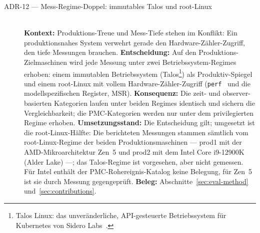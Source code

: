 \begin{description}
  \item[ADR-12 --- Mess-Regime-Doppel: immutables Talos und root-Linux]\hfill\\
  \textbf{Kontext:} Produktions-Treue und Mess-Tiefe stehen im Konflikt: Ein produktionsnahes
  System verwehrt gerade den Hardware-Zähler-Zugriff, den tiefe Messungen brauchen.
  \textbf{Entscheidung:} Auf den Produktions-Zielmaschinen wird jede Messung unter zwei
  Betriebssystem-Regimes erhoben: einem immutablen Betriebssystem (Talos\footnote{Talos Linux: das
  unveränderliche, API-gesteuerte Betriebssystem für Kubernetes von Sidero
  Labs~\cite{siderolabs_talos}.}) als Produktiv-Spiegel und einem root-Linux mit vollem
  Hardware-Zähler-Zugriff (\texttt{perf}~\cite{demelo2010perf,linux_perf_event_open} und die
  modellspezifischen Register, MSR).
  \textbf{Konsequenz:} Die zeit- und observer-basierten Kategorien laufen unter beiden Regimes
  identisch und sichern die Vergleichbarkeit; die PMC-Kategorien werden nur unter dem
  privilegierten Regime erhoben.
  \textbf{Umsetzungsstand:} Die Entscheidung gilt; umgesetzt ist die root-Linux-Hälfte: Die berichteten
  Messungen stammen sämtlich vom root-Linux-Regime der beiden Produktionsmaschinen --- prod1 mit der
  AMD-Mikroarchitektur Zen~5 und prod2 mit dem Intel Core i9-12900K (Alder Lake) ---; das
  Talos-Regime ist vorgesehen, aber nicht gemessen. Für Intel enthält der PMC-Rohereignis-Katalog
  keine Belegung, für Zen~5 ist sie durch Messung gegengeprüft.
  \textbf{Beleg:} Abschnitte~\ref{sec:eval-method} und~\ref{sec:contributions}.


\end{description}
